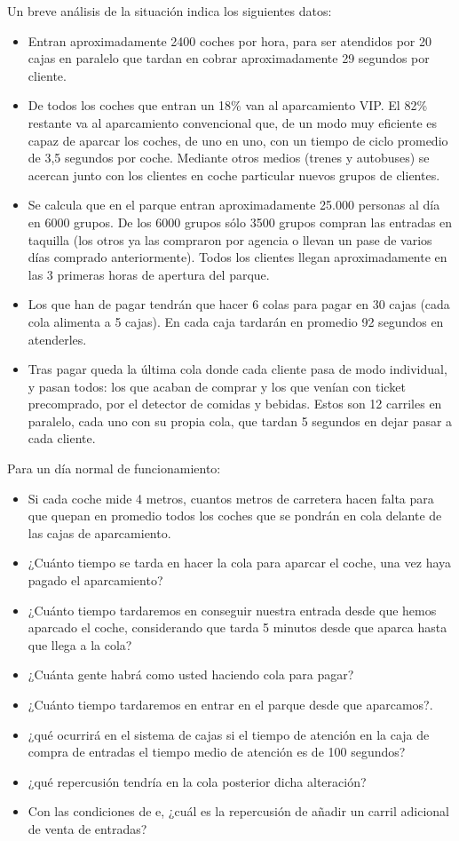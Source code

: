 \documentclass[
]{book}
\providecommand{\tightlist}{%
  \setlength{\itemsep}{0pt}\setlength{\parskip}{0pt}}
\theoremstyle{definition}
\theoremstyle{definition}
\theoremstyle{definition}
\theoremstyle{definition}
\theoremstyle{remark}
\begin{document}
Un breve análisis de la situación indica los siguientes datos:

\begin{itemize}
\tightlist
\item
  Entran aproximadamente 2400 coches por hora, para ser atendidos por 20 cajas en paralelo que tardan en cobrar aproximadamente 29 segundos por cliente.
\item
  De todos los coches que entran un 18\% van al aparcamiento VIP. El 82\% restante va al aparcamiento convencional que, de un modo muy eficiente es capaz de aparcar los coches, de uno en uno, con un tiempo de ciclo promedio de 3,5 segundos por coche. Mediante otros medios (trenes y autobuses) se acercan junto con los clientes en coche particular nuevos grupos de clientes.
\item
  Se calcula que en el parque entran aproximadamente 25.000 personas al día en 6000 grupos. De los 6000 grupos sólo 3500 grupos compran las entradas en taquilla (los otros ya las compraron por agencia o llevan un pase de varios días comprado anteriormente). Todos los clientes llegan aproximadamente en las 3 primeras horas de apertura del parque.\\
\item
  Los que han de pagar tendrán que hacer 6 colas para pagar en 30 cajas (cada cola alimenta a 5 cajas). En cada caja tardarán en promedio 92 segundos en atenderles.
\item
  Tras pagar queda la última cola donde cada cliente pasa de modo individual, y pasan todos: los que acaban de comprar y los que venían con ticket precomprado, por el detector de comidas y bebidas. Estos son 12 carriles en paralelo, cada uno con su propia cola, que tardan 5 segundos en dejar pasar a cada cliente.
\end{itemize}

Para un día normal de funcionamiento:

\begin{itemize}
\tightlist
\item
  Si cada coche mide 4 metros, cuantos metros de carretera hacen falta para que quepan en promedio todos los coches que se pondrán en cola delante de las cajas de aparcamiento.
\item
  ¿Cuánto tiempo se tarda en hacer la cola para aparcar el coche, una vez haya pagado el aparcamiento?
\item
  ¿Cuánto tiempo tardaremos en conseguir nuestra entrada desde que hemos aparcado el coche, considerando que tarda 5 minutos desde que aparca hasta que llega a la cola?
\item
  ¿Cuánta gente habrá como usted haciendo cola para pagar?
\item
  ¿Cuánto tiempo tardaremos en entrar en el parque desde que aparcamos?.
\item
  ¿qué ocurrirá en el sistema de cajas si el tiempo de atención en la caja de compra de entradas el tiempo medio de atención es de 100 segundos?
\item
  ¿qué repercusión tendría en la cola posterior dicha alteración?
\item
  Con las condiciones de e, ¿cuál es la repercusión de añadir un carril adicional de venta de entradas?
\end{itemize}
\end{document}
